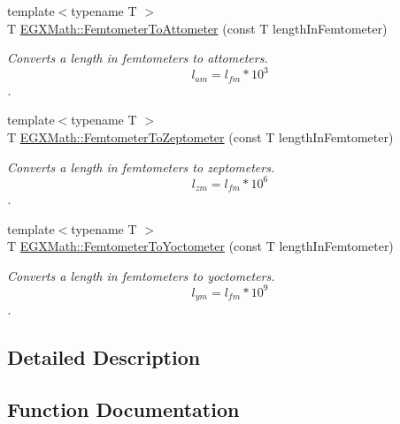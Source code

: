 \begin{DoxyCompactItemize}
{\footnotesize template$<$typename T $>$ }\\T \mbox{\hyperlink{group___e_g_x_math-_conversions-_length_conversions-_femtometer-_s_i_ga62157df6cfd3d6b801c521105b7f4f71}{E\+G\+X\+Math\+::\+Femtometer\+To\+Attometer}} (const T length\+In\+Femtometer)
\begin{DoxyCompactList}\small\item\em Converts a length in femtometers to attometers. \[ l_{am}=l_{fm} * 10^{3} \]. \end{DoxyCompactList}\item 
{\footnotesize template$<$typename T $>$ }\\T \mbox{\hyperlink{group___e_g_x_math-_conversions-_length_conversions-_femtometer-_s_i_ga9bcc5cf611f6646652effc080ce29f1a}{E\+G\+X\+Math\+::\+Femtometer\+To\+Zeptometer}} (const T length\+In\+Femtometer)
\begin{DoxyCompactList}\small\item\em Converts a length in femtometers to zeptometers. \[ l_{zm}=l_{fm} * 10^{6} \]. \end{DoxyCompactList}\item 
{\footnotesize template$<$typename T $>$ }\\T \mbox{\hyperlink{group___e_g_x_math-_conversions-_length_conversions-_femtometer-_s_i_ga6406395140da34327a85098a7dd9e4f0}{E\+G\+X\+Math\+::\+Femtometer\+To\+Yoctometer}} (const T length\+In\+Femtometer)
\begin{DoxyCompactList}\small\item\em Converts a length in femtometers to yoctometers. \[ l_{ym}=l_{fm} * 10^{9} \]. \end{DoxyCompactList}\end{DoxyCompactItemize}


\subsection{Detailed Description}


\subsection{Function Documentation}
\mbox{\label{group___e_g_x_math-_conversions-_length_conversions-_femtometer-_s_i_ga62157df6cfd3d6b801c521105b7f4f71}} 
